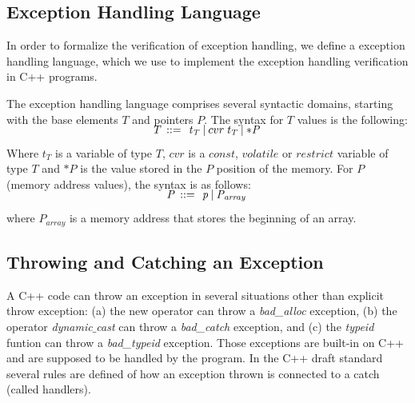 \documentclass[a4paper]{llncs}
\begin{document}
\subsection{Exception Handling Language}

In order to formalize the verification of exception handling, we
define a exception handling language, which we use to implement
the exception handling verification in C++ programs.

The exception handling language comprises several syntactic domains,
starting with the base elements $\mathit{T}$ and pointers $\mathit{P}$.
The syntax for $\mathit{T}$ values is the following:
%
\[\begin{array}{r@{\:\:}c@{\:\:}l}\label{element-semantics}
\\[-5ex]
\mathit{T}   & ::= & \: \mathit{t_T} \: | \: cvr \: \mathit{t_T} \: | \: \mathit{*P} \: \\
\end{array}
\]
%
Where $\mathit{t_T}$ is a variable of type $\mathit{T}$, $cvr$ is a $const$,
$volatile$ or $restrict$ variable of type $\mathit{T}$ and $\mathit{*P}$
is the value stored in the $\mathit{P}$ position of the memory.
For $\mathit{P}$ (memory address values), the syntax is as follows:
%
\[\begin{array}{r@{\:\:}c@{\:\:}l}\label{pointer-semantics}
\\[-5ex]
\mathit{P}  & ::= & \: \mathit{p} \: | \: \mathit{P_{array}} \: \\
\end{array}
\]
%
where $\mathit{P_{array}}$ is a memory address that stores the beginning
of an array.

\subsection{Throwing and Catching an Exception}

A C++ code can throw an exception in several situations other
than explicit throw exception: (a) the new operator can throw
a \textit{bad\_alloc} exception, (b) the operator
\textit{dynamic$\_$cast} can throw a \textit{bad\_catch}
exception, and (c) the \textit{typeid} funtion can throw a
\textit{bad\_typeid} exception.
Those exceptions are built-in on C++ and are supposed to be
handled by the program. In the C++ draft standard~\cite{CppDraft}
several rules are defined of how an exception
thrown is connected to a catch (called handlers).
\end{document}

